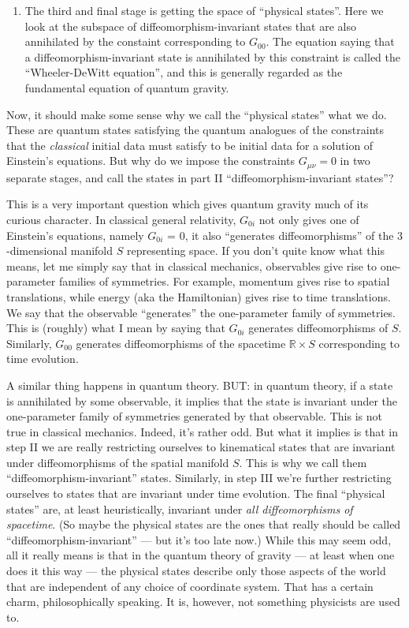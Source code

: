 \documentclass{article}
\def\tightlist{}
\begin{document}
\begin{enumerate}
\def\labelenumi{\Roman{enumi})}
\setcounter{enumi}{2}
\tightlist
\item
  The third and final stage is getting the space of ``physical states''.
  Here we look at the subspace of diffeomorphism-invariant states that
  are also annihilated by the constaint corresponding to \(G_{00}\). The
  equation saying that a diffeomorphism-invariant state is annihilated
  by this constraint is called the ``Wheeler-DeWitt equation'', and this
  is generally regarded as the fundamental equation of quantum gravity.
\end{enumerate}

Now, it should make some sense why we call the ``physical states'' what
we do. These are quantum states satisfying the quantum analogues of the
constraints that the \emph{classical} initial data must satisfy to be
initial data for a solution of Einstein's equations. But why do we
impose the constraints \(G_{\mu \nu} = 0\) in two separate stages, and
call the states in part II ``diffeomorphism-invariant states''?

This is a very important question which gives quantum gravity much of
its curious character. In classical general relativity, \(G_{0i}\) not
only gives one of Einstein's equations, namely \(G_{0i}\) = 0, it also
``generates diffeomorphisms'' of the \(3\)-dimensional manifold \(S\)
representing space. If you don't quite know what this means, let me
simply say that in classical mechanics, observables give rise to
one-parameter families of symmetries. For example, momentum gives rise
to spatial translations, while energy (aka the Hamiltonian) gives rise
to time translations. We say that the observable ``generates'' the
one-parameter family of symmetries. This is (roughly) what I mean by
saying that \(G_{0i}\) generates diffeomorphisms of \(S\). Similarly,
\(G_{00}\) generates diffeomorphisms of the spacetime
\(\mathbb{R} \times S\) corresponding to time evolution.

A similar thing happens in quantum theory. BUT: in quantum theory, if a
state is annihilated by some observable, it implies that the state is
invariant under the one-parameter family of symmetries generated by that
observable. This is not true in classical mechanics. Indeed, it's rather
odd. But what it implies is that in step II we are really restricting
ourselves to kinematical states that are invariant under diffeomorphisms
of the spatial manifold \(S\). This is why we call them
``diffeomorphism-invariant'' states. Similarly, in step III we're
further restricting ourselves to states that are invariant under time
evolution. The final ``physical states'' are, at least heuristically,
invariant under \emph{all diffeomorphisms of spacetime}. (So maybe the
physical states are the ones that really should be called
``diffeomorphism-invariant'' --- but it's too late now.) While this may
seem odd, all it really means is that in the quantum theory of gravity
--- at least when one does it this way --- the physical states describe
only those aspects of the world that are independent of any choice of
coordinate system. That has a certain charm, philosophically speaking.
It is, however, not something physicists are used to.
\end{document}
